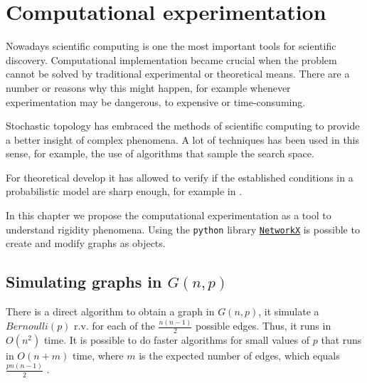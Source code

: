 
\chapter{Computational experimentation} %

\label{Chapter3} %



Nowadays scientific computing is one the most important tools for scientific discovery. Computational implementation became crucial when the problem cannot be solved by traditional experimental or theoretical means. There are a number or reasons why this might happen, for example whenever experimentation may be dangerous, to expensive or time-consuming.

Stochastic topology has embraced the methods of scientific computing to provide a better insight of complex phenomena. A lot of techniques has been used in this sense, for example, the use of algorithms that sample the search space.

For theoretical develop it has allowed to verify if the established conditions in a probabilistic model are sharp enough, for example in \cite{Meshulam13}.

In this chapter we propose the computational experimentation as a tool to understand rigidity phenomena. Using the \texttt{python} library \texttt{\href{https://networkx.github.io/}{NetworkX}} is possible to create and modify graphs as objects.

\section{Simulating graphs in $G(n,p)$}

There is a direct algorithm to obtain a graph in $G(n,p)$, it simulate a $Bernoulli(p)$ r.v. for each of the $\frac{n(n-1)}{2}$ possible edges. Thus, it runs in $O(n^2)$ time. It is possible to do faster algorithms for small values of $p$ that runs in $O(n + m)$ time, where $m$ is the expected number of edges, which equals $\frac{pn(n - 1)}{2}$ \cite{fastER}.

